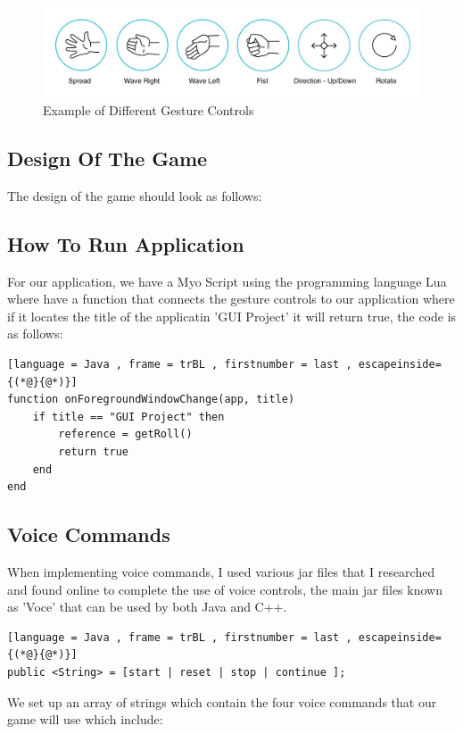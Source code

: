 \documentclass{article}
\begin{document}
\begin{figure}[h]
  \includegraphics[width=\textwidth]{img/gestures.jpg}
  \centering
  \caption{Example of Different Gesture Controls}
  \label{fig: Myo Armband Gesture Controls}
\end{figure}

\subsection{Design Of The Game}

The design of the game should look as follows:

\subsection{How To Run Application}

For our application, we have a Myo Script using the programming language Lua where have a function that connects the gesture controls to our application where if it locates the title of the applicatin 'GUI Project' it will return true, the code is as follows:

\begin{lstlisting}[language = Java , frame = trBL , firstnumber = last , escapeinside={(*@}{@*)}]
function onForegroundWindowChange(app, title)
    if title == "GUI Project" then
        reference = getRoll()
        return true
    end 
end
\end{lstlisting}

\subsection{Voice Commands}

When implementing voice commands, I used various jar files that I researched and found online to complete the use of voice controls, the main jar files known as 'Voce' that can be used by both Java and C++.

\begin{lstlisting}[language = Java , frame = trBL , firstnumber = last , escapeinside={(*@}{@*)}]
public <String> = [start | reset | stop | continue ];
\end{lstlisting}
We set up an array of strings which contain the four voice commands that our game will use which include:
\end{document}
